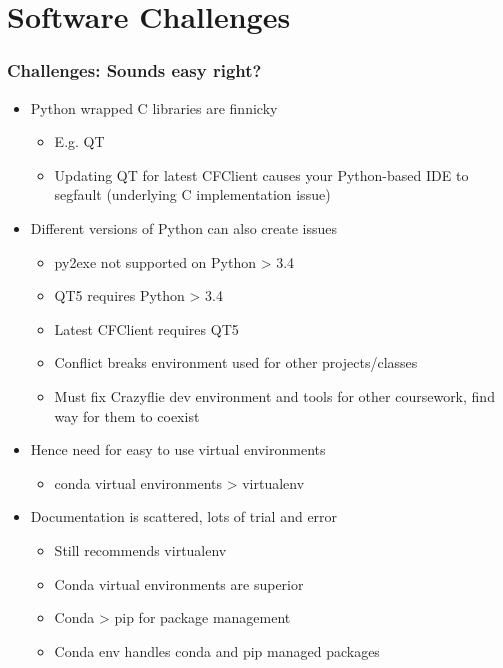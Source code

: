 \documentclass[t, xcolor=dvipsnames]{beamer}
\begin{document}
\section{Software Challenges}
\begin{frame}
	\frametitle{Challenges: Sounds easy right?}
	\begin{itemize}
		\item Python wrapped C libraries are finnicky
			\begin{itemize}
				\item E.g. QT 
				\item Updating QT for latest CFClient causes your Python-based IDE to segfault (underlying C implementation issue)
			\end{itemize}
		\item Different versions of Python can also create issues
			\begin{itemize}
				\item py2exe not supported on Python > 3.4
				\item QT5 requires Python > 3.4
				\item Latest CFClient requires QT5
				\item Conflict breaks environment used for other projects/classes
				\item Must fix Crazyflie dev environment and tools for other coursework, find way for them to coexist
			\end{itemize}
		\item Hence need for easy to use virtual environments
			\begin{itemize}
				\item conda virtual environments > virtualenv
			\end{itemize}
		\item Documentation is scattered, lots of trial and error
			\begin{itemize}
				\item Still recommends virtualenv
				\item Conda virtual environments are superior
				\item Conda > pip for package management
				\item Conda env handles conda and pip managed packages
			\end{itemize}
	\end{itemize}
\end{frame}


%
\end{document}
